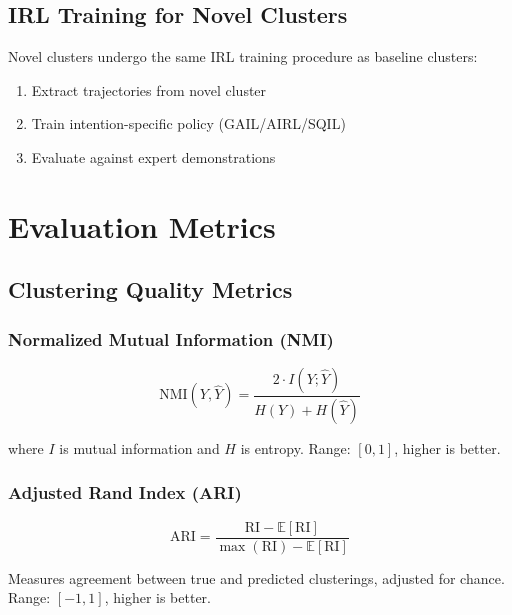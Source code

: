 \documentclass{article}
\begin{document}
\subsection{IRL Training for Novel Clusters}

Novel clusters undergo the same IRL training procedure as baseline clusters:

\begin{enumerate}
    \item Extract trajectories from novel cluster
    \item Train intention-specific policy (GAIL/AIRL/SQIL)
    \item Evaluate against expert demonstrations
\end{enumerate}

\section{Evaluation Metrics}

\subsection{Clustering Quality Metrics}

\subsubsection{Normalized Mutual Information (NMI)}

\begin{equation}
    \text{NMI}(Y, \hat{Y}) = \frac{2 \cdot I(Y; \hat{Y})}{H(Y) + H(\hat{Y})}
\end{equation}

where $I$ is mutual information and $H$ is entropy. Range: $[0, 1]$, higher is better.

\subsubsection{Adjusted Rand Index (ARI)}

\begin{equation}
    \text{ARI} = \frac{\text{RI} - \mathbb{E}[\text{RI}]}{\max(\text{RI}) - \mathbb{E}[\text{RI}]}
\end{equation}

Measures agreement between true and predicted clusterings, adjusted for chance. Range: $[-1, 1]$, higher is better.
\end{document}

